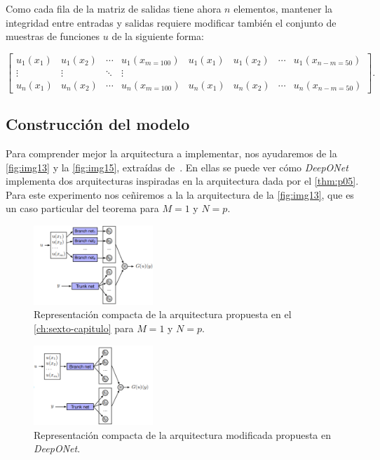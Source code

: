 Como cada fila de la matriz de salidas tiene ahora $n$ elementos, mantener la integridad entre entradas y salidas requiere modificar también el conjunto de muestras de funciones $u$ de la siguiente forma: 

\[
\begin{bmatrix}
u_1(x_1) & u_1(x_2) & \cdots & u_1(x_{m=100}) & u_1(x_1) & u_1(x_2) & \cdots & u_1(x_{n-m=50})\\
\vdots & \vdots & \ddots & \vdots \\
u_n(x_1) & u_n(x_2) & \cdots & u_n(x_{m=100}) & u_n(x_1) & u_n(x_2) & \cdots & u_n(x_{n-m=50})
\end{bmatrix}.
\]






\subsection{Construcción del modelo}\label{sec:8.4.4}

Para comprender mejor la arquitectura a implementar, nos ayudaremos de la \autoref{fig:img13} y la \autoref{fig:img15}, extraídas de~\cite{lu2024deeponet}. En ellas se puede ver cómo \textit{DeepONet} implementa dos arquitecturas inspiradas en la arquitectura dada por el \autoref{thm:p05}. Para este experimento nos ceñiremos a la la arquitectura de la \autoref{fig:img13}, que es un caso particular del teorema para $M=1$ y $N=p$.

 \begin{figure}[htbp]
    \centering
    \includegraphics[width=0.4\textwidth]{img/img13.png}
    \caption{Representación compacta de la arquitectura propuesta en el \autoref{ch:sexto-capitulo} para $M=1$ y $N=p$.}
    \label{fig:img13}
\end{figure}

 \begin{figure}[htbp]
    \centering
    \includegraphics[width=0.4\textwidth]{img/img15.png}
    \caption{Representación compacta  de la arquitectura modificada propuesta en \textit{DeepONet}.}
    \label{fig:img15}
\end{figure}

